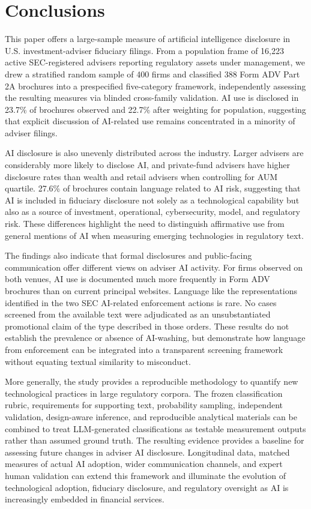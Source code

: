 \documentclass[utf8]{FrontiersinHarvard}
\begin{document}
\section{Conclusions}

This paper offers a large-sample measure of artificial intelligence disclosure in U.S. investment-adviser fiduciary filings. From a population frame of 16{,}223 active SEC-registered advisers reporting regulatory assets under management, we drew a stratified random sample of 400 firms and classified 388 Form ADV Part 2A brochures into a prespecified five-category framework, independently assessing the resulting measures via blinded cross-family validation. AI use is disclosed in 23.7\% of brochures observed and 22.7\% after weighting for population, suggesting that explicit discussion of AI-related use remains concentrated in a minority of adviser filings.

AI disclosure is also unevenly distributed across the industry. Larger advisers are considerably more likely to disclose AI, and private-fund advisers have higher disclosure rates than wealth and retail advisers when controlling for AUM quartile. 27.6\% of brochures contain language related to AI risk, suggesting that AI is included in fiduciary disclosure not solely as a technological capability but also as a source of investment, operational, cybersecurity, model, and regulatory risk. These differences highlight the need to distinguish affirmative use from general mentions of AI when measuring emerging technologies in regulatory text.

The findings also indicate that formal disclosures and public-facing communication offer different views on adviser AI activity. For firms observed on both venues, AI use is documented much more frequently in Form ADV brochures than on current principal websites. Language like the representations identified in the two SEC AI-related enforcement actions is rare. No cases screened from the available text were adjudicated as an unsubstantiated promotional claim of the type described in those orders. These results do not establish the prevalence or absence of AI-washing, but demonstrate how language from enforcement can be integrated into a transparent screening framework without equating textual similarity to misconduct.

More generally, the study provides a reproducible methodology to quantify new technological practices in large regulatory corpora. The frozen classification rubric, requirements for supporting text, probability sampling, independent validation, design-aware inference, and reproducible analytical materials can be combined to treat LLM-generated classifications as testable measurement outputs rather than assumed ground truth. The resulting evidence provides a baseline for assessing future changes in adviser AI disclosure. Longitudinal data, matched measures of actual AI adoption, wider communication channels, and expert human validation can extend this framework and illuminate the evolution of technological adoption, fiduciary disclosure, and regulatory oversight as AI is increasingly embedded in financial services.
\end{document}
